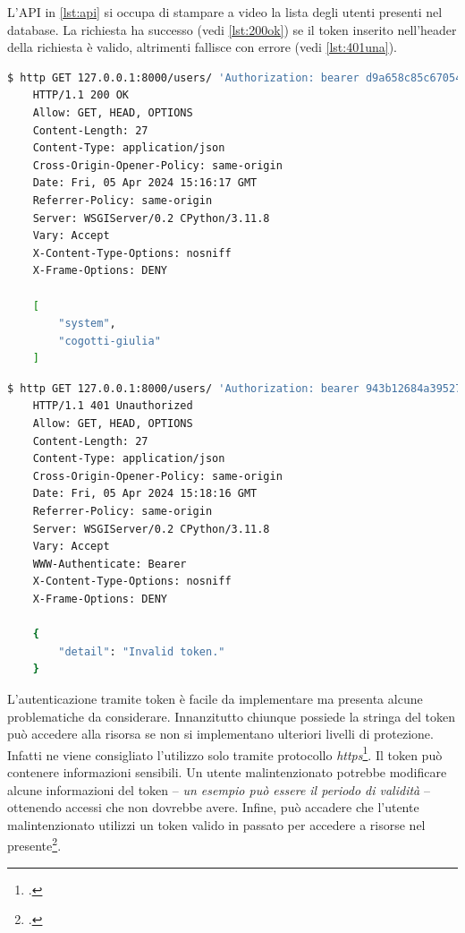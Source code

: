 \documentclass[./main.tex]{subfiles}
\begin{document}
L'API in \autoref{lst:api} si occupa di stampare a video la lista degli utenti presenti nel database. La richiesta ha successo (vedi \autoref{lst:200ok}) se il token inserito nell'header della richiesta è valido, altrimenti fallisce con errore (vedi \autoref{lst:401una}).\par

\begin{lstlisting}[language=bash, caption=HTTP/1.1 200 OK, label=lst:200ok]
    $ http GET 127.0.0.1:8000/users/ 'Authorization: bearer d9a658c85c67054c6c3626848ffac953fe3a9c6f'
    HTTP/1.1 200 OK
    Allow: GET, HEAD, OPTIONS
    Content-Length: 27
    Content-Type: application/json
    Cross-Origin-Opener-Policy: same-origin
    Date: Fri, 05 Apr 2024 15:16:17 GMT
    Referrer-Policy: same-origin
    Server: WSGIServer/0.2 CPython/3.11.8
    Vary: Accept
    X-Content-Type-Options: nosniff
    X-Frame-Options: DENY
    
    [
        "system",
        "cogotti-giulia"
    ]  
\end{lstlisting}

\begin{lstlisting}[language=bash, caption=HTTP/1.1 401 Unauthorized, label=lst:401una]
    $ http GET 127.0.0.1:8000/users/ 'Authorization: bearer 943b12684a39527e57cb0b4e70699883ca36e63c'
    HTTP/1.1 401 Unauthorized
    Allow: GET, HEAD, OPTIONS
    Content-Length: 27
    Content-Type: application/json
    Cross-Origin-Opener-Policy: same-origin
    Date: Fri, 05 Apr 2024 15:18:16 GMT
    Referrer-Policy: same-origin
    Server: WSGIServer/0.2 CPython/3.11.8
    Vary: Accept
    WWW-Authenticate: Bearer
    X-Content-Type-Options: nosniff
    X-Frame-Options: DENY
    
    {
        "detail": "Invalid token."
    }
\end{lstlisting}

L'autenticazione tramite token è facile da implementare ma presenta alcune problematiche da considerare. Innanzitutto chiunque possiede la stringa del token può accedere alla risorsa se non si implementano ulteriori livelli di protezione. Infatti ne viene consigliato l'utilizzo solo tramite protocollo \textit{https}\footcite[{https://www.django-rest-framework.org/}]{website-django-rest-framwork}. Il token può contenere informazioni sensibili. Un utente malintenzionato potrebbe modificare alcune informazioni del token -- \textit{un esempio può essere il periodo di validità} -- ottenendo accessi che non dovrebbe avere. Infine, può accadere che l'utente malintenzionato utilizzi un token valido in passato per accedere a risorse nel presente\footcite[10-11]{rfc6750}.\par
\end{document}

